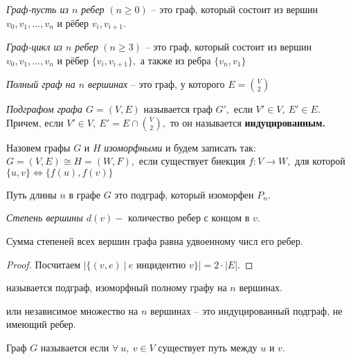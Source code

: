 \begin{definition}
    \textit{Граф-пусть из $n$ ребер} $(n \geq 0)$ -- это граф, который состоит из вершин ${v_0, v_1, \dots , v_n}$ и рёбер ${v_i, v_{i+1}}.$

    \textit{Граф-цикл из $n$ ребер} $(n \geq 3)$ -- это граф, который состоит из вершин ${v_0, v_1, \dots , v_n}$ и рёбер $\{v_i, v_{i+1}\},$ а также из ребра $\{v_n, v_1 \}$

    \textit{Полный граф на $n$ вершинах} -- это граф, у которого $E = \binom{V}{2}$

  \textit{Подграфом графа $G = (V, E)$} называется граф $G',$ если $V' \in V, \ E' \in E.$ Причем, если $V' \in V, \ E' = E \cap  \binom{V}{2},$ то он называется \textbf{индуцированным.}
\end{definition}

\begin{definition}
    Назовем графы $G$ и $H$ \textit{изоморфными} и будем записать так: $G = (V, E) \cong H = (W, F),$
    если существует биекция $f: V \rightarrow W,$ для которой $\{u, v \} \Longleftrightarrow \{ f(u), f(v) \}$
\end{definition}

\begin{definition}
    Путь длины $n$ в графе $G$ это подграф, который изоморфен $P_{n}.$
\end{definition}

\begin{definition}
    \textit{Степень вершины $d(v) -$} количество ребер с концом в $v.$
\end{definition}

\begin{lemma}
    Сумма степеней всех вершин графа равна удвоенному числ его ребер.
\end{lemma}
\begin{proof}
    Посчитаем $|\{(v, e) \ | \ e \text{ инцидентно } v \} | = 2 \cdot |E|.$
\end{proof}

\begin{definition}
     называется подграф, изоморфный полному графу на $n$ вершинах.

     или независимое множество на $n$ вершинах -- это индуцированный подграф, не имеющий ребер.
\end{definition}

\begin{definition}
    Граф $G$ называется  если $\forall \ u, \ v \in V $ существует путь между $u$ и $v.$ 
\end{definition}

